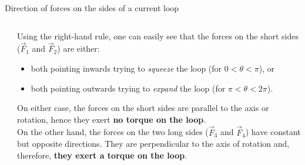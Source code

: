 \begin{frame}{Direction of forces on the sides of a current loop}
\begin{columns}
\begin{column}{0.37\textwidth}
  \end{column}
  \begin{column}{0.63\textwidth}
  {\small
    Using the right-hand rule, one can easily see that the forces on the
    short sides ($\vec{F}_1$ and $\vec{F}_2$) are either:
    \begin{itemize}
        \item both pointing inwards trying to {\em squeeze} the loop (for $ 0 < \theta < \pi$), or
        \item both pointing outwards trying to {\em expand} the loop (for $\pi < \theta < 2\pi$).
    \end{itemize}
    On either case, the forces on the short sides are parallel to the axis or rotation,
    hence they exert {\bf no torque on the loop}.\\
    \vspace{0.2cm}
    On the other hand, the forces on the two long sides ($\vec{F}_3$ and $\vec{F}_4$)
    have constant but opposite directions. They are perpendicular to the axis of rotation and,
    therefore, {\bf they exert a torque on the loop}.\\
  }
  \end{column}
\end{columns}

\end{frame}


%
%
%

